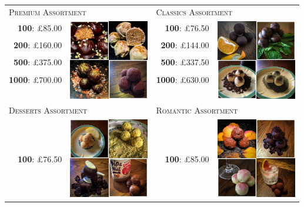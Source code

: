\documentclass[11pt, english]{article}
\begin{document}
	\begin{table}[h]
	\begin{center}
	\begin{tabular}{r|p{4cm}r|p{4cm}}
		\multicolumn{2}{l}{\textsc{Premium Assortment}} & \multicolumn{2}{l}{\textsc{Classics Assortment}}\\
		\textbf{100}: \pounds85.00 & \multirow{8}{*}{\includegraphics[width=3.5cm,height=3.5cm]{../Photos_Shop/Premium.png}} & \textbf{100}: \pounds76.50 & \multirow{8}{*}{\includegraphics[width=3.5cm,height=3.5cm]{../Photos_Shop/Classics.png}}\\
		\textbf{200}: \pounds160.00 & & \textbf{200}: \pounds144.00 & \\
		\textbf{500}: \pounds375.00 & & \textbf{500}: \pounds337.50 & \\
		\textbf{1000}: \pounds700.00 & & \textbf{1000}: \pounds630.00 & \\
		\multicolumn{4}{l}{}\\
		\multicolumn{4}{l}{}\\
		\multicolumn{4}{l}{}\\
		\multicolumn{4}{l}{}\\
		\multicolumn{2}{l}{\textsc{Desserts Assortment}} & \multicolumn{2}{l}{\textsc{Romantic Assortment}}\\
		\textbf{100}: \pounds76.50 & \multirow{5}{*}{\includegraphics[width=3.5cm,height=3.5cm]{../Photos_Shop/Desserts.png}} & \textbf{100}: \pounds85.00 & \multirow{5}{*}{\includegraphics[width=3.5cm,height=3.5cm]{../Photos_Shop/Romantic.png}}\\

\end{tabular}
\end{center}
\end{table}
\end{document}
